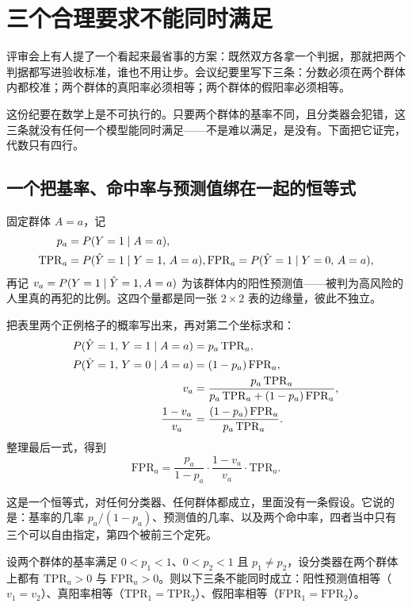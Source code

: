 \section{三个合理要求不能同时满足}
\label{sec:17-Constrained-Guarantees/03-Fairness-Impossibility/02}

评审会上有人提了一个看起来最省事的方案：既然双方各拿一个判据，那就把两个判据都写进验收标准，谁也不用让步。会议纪要里写下三条：分数必须在两个群体内都校准；两个群体的真阳率必须相等；两个群体的假阳率必须相等。

这份纪要在数学上是不可执行的。只要两个群体的基率不同，且分类器会犯错，这三条就没有任何一个模型能同时满足——不是难以满足，是没有。下面把它证完，代数只有四行。

\subsection{一个把基率、命中率与预测值绑在一起的恒等式}

固定群体 \(A=a\)，记
\[
\begin{aligned}
p_a&=P(Y=1\mid A=a),\\
\mathrm{TPR}_a&=P(\hat Y=1\mid Y=1,\,A=a),\space
\mathrm{FPR}_a=P(\hat Y=1\mid Y=0,\,A=a),
\end{aligned}
\]
再记 \(v_a=P(Y=1\mid \hat Y=1,A=a)\) 为该群体内的阳性预测值——被判为高风险的人里真的再犯的比例。这四个量都是同一张 \(2\times2\) 表的边缘量，彼此不独立。

把表里两个正例格子的概率写出来，再对第二个坐标求和：
\[
\begin{aligned}
P(\hat Y=1,\,Y=1\mid A=a)&=p_a\,\mathrm{TPR}_a,\\
P(\hat Y=1,\,Y=0\mid A=a)&=(1-p_a)\,\mathrm{FPR}_a,\\
v_a&=\frac{p_a\,\mathrm{TPR}_a}{p_a\,\mathrm{TPR}_a+(1-p_a)\,\mathrm{FPR}_a},\\
\frac{1-v_a}{v_a}&=\frac{(1-p_a)\,\mathrm{FPR}_a}{p_a\,\mathrm{TPR}_a}.
\end{aligned}
\]
整理最后一式，得到
\[
\mathrm{FPR}_a=\frac{p_a}{1-p_a}\cdot\frac{1-v_a}{v_a}\cdot\mathrm{TPR}_a .
\]

这是一个恒等式，对任何分类器、任何群体都成立，里面没有一条假设。它说的是：基率的几率 \(p_a/(1-p_a)\)、预测值的几率、以及两个命中率，四者当中只有三个可以自由指定，第四个被前三个定死。

\begin{proposition}
设两个群体的基率满足 \(0<p_1<1\)、\(0<p_2<1\) 且 \(p_1\neq p_2\)，设分类器在两个群体上都有 \(\mathrm{TPR}_a>0\) 与 \(\mathrm{FPR}_a>0\)。则以下三条不能同时成立：阳性预测值相等（\(v_1=v_2\)）、真阳率相等（\(\mathrm{TPR}_1=\mathrm{TPR}_2\)）、假阳率相等（\(\mathrm{FPR}_1=\mathrm{FPR}_2\)）。
\end{proposition}

